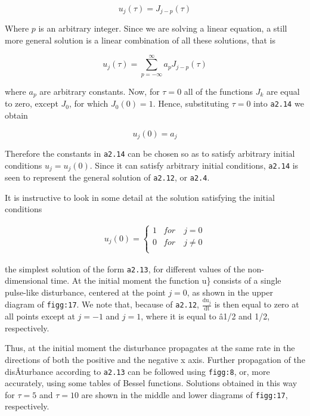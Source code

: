 \[u_{j}\left( \tau \right) = J_{j - p}\left( \tau \right)\]

\begin{figure}
\centering
{}
\caption{}
\end{figure}

Where \(p\) is an arbitrary integer. Since we are solving a linear
equation, a still more general solution is a linear combination of all
these solutions, that is

{\[u_{j}\left( \tau \right) = \sum_{p = - \infty}^{\infty}{a_{p}J_{j - p}}\left( \tau \right)\]}

where \(a_{p}\) are arbitrary constants. Now, for \(\tau = 0\) all of
the functions \(J_{k}\) are equal to zero, except \(J_{0}\), for which
\(J_{0}\left( 0 \right) = 1\). Hence, substituting \(\tau = 0\) into
\texttt{a2.14} we obtain

{\[u_{j}\left( 0 \right) = a_{j}\]}

Therefore the constants in \texttt{a2.14} can be chosen so as to satisfy
arbitrary initial conditions \(u_{j} = u_{j}\left( 0 \right)\). Since it
can satisfy arbitrary initial conditions, \texttt{a2.14} is seen to
represent the general solution of \texttt{a2.12}, or \texttt{a2.4}.

It is instructive to look in some detail at the solution satisfying the
initial conditions

{\[\begin{aligned}
u_{j}\left( 0 \right) = \left\{ \begin{array}{cc}
1  &  for \quad j = 0\\
0  &  for \quad j \neq 0\\
\end{array} \right.
\end{aligned}\]}

the simplest solution of the form \texttt{a2.13}, for different values
of the non-dimensional time. At the initial moment the function u\}
consists of a single pulse-like disturbance, centered at the point
\(j = 0\), as shown in the upper diagram of \texttt{figg:17}. We note
that, because of \texttt{a2.12}, \(\frac{\text{du}_{j}}{\text{dt}}\) is
then equal to zero at all points except at \(j = - 1\) and \(j = 1\),
where it is equal to â1/2 and 1/2, respectively.

Thus, at the initial moment the disturbance propagates at the same rate
in the directions of both the positive and the negative x axis. Further
propagation of the disÂ­turbance according to \texttt{a2.13} can be
followed using \texttt{figg:8}, or, more accurately, using some tables
of Bessel functions. Solutions obtained in this way for \(\tau = 5\) and
\(\tau = 10\) are shown in the middle and lower diagrams of
\texttt{figg:17}, respectively.

